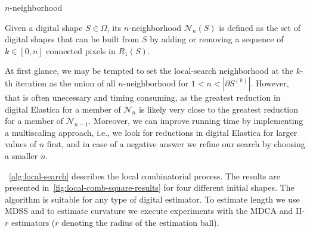 \begin{definition}{$n$-neighborhood}

	Given a digital shape $S \in \Omega$, its $n$-neigh\-bor\-hood $\mathcal{N}_n(S)$ is defined as the set of digital shapes that can be built from $S$ by adding or removing a sequence of $k \in [0,n]$ connected pixels in $R_1(S)$.

\end{definition}


At first glance, we may be tempted to set the local-search neighborhood at the $k$-th iteration as the union of all $n$-neighborhood for $1<n<|\partial S^{(k)}|$. However, that is often unecessary and timing consuming, as the greatest reduction in digital Elastica for a member of $\mathcal{N}_n$ is likely very close to the greatest reduction for a member of $\mathcal{N}_{n-1}$. Moreover, we can improve running time by implementing a multiscaling approach, i.e., we look for reductions in digital Elastica for larger values of $n$ first, and in case of a negative answer we refine our search by choosing a smaller $n$.

~\cref{alg:local-search} describes the local combinatorial process.  The results are presented in~\cref{fig:local-comb-square-results} for four different initial shapes. The algorithm is suitable for any type of digital estimator. To estimate length we use MDSS and to estimate curvature we execute experiments with the MDCA and II-$r$ estimators ($r$ denoting the radius of the estimation ball). 
	

